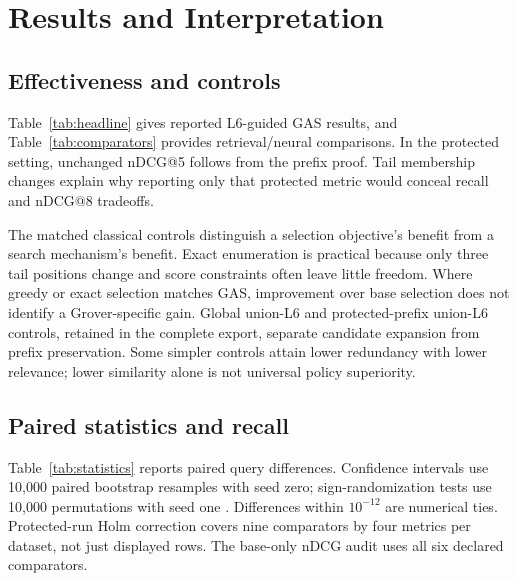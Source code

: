 \documentclass[conference]{IEEEtran}
\newcommand{\resultinput}[1]{}
\begin{document}
\section{Results and Interpretation}\label{sec:results}
\subsection{Effectiveness and controls}
Table~\ref{tab:headline} gives reported L6-guided GAS results, and Table~\ref{tab:comparators} provides retrieval/neural comparisons. \resultinput{findings.tex}
In the protected setting, unchanged nDCG@5 follows from the prefix proof. Tail membership changes explain why reporting only that protected metric would conceal recall and nDCG@8 tradeoffs.
\resultinput{fiqa_followup.tex}

\begin{table}[t]
\centering\small\setlength{\tabcolsep}{3pt}
\caption{Reported L6-guided GAS full-test means. Red. is lower-is-better. \protect\resultinput{configuration_note.tex}}
\label{tab:headline}
\resultinput{headline.tex}
\end{table}

\begin{table}[t]
\centering\small\setlength{\tabcolsep}{4pt}
\caption{Full-test comparisons. n@5: nDCG@5; R@8: Recall@8; Red.: clipped-positive cosine redundancy. GAS/matched optimizers follow Table~\ref{tab:headline}. Base/L6-only use hybrid fifteen; dense-fifteen controls use a different shortlist.}
\label{tab:comparators}
\resultinput{comparators.tex}
\end{table}

The matched classical controls distinguish a selection objective's benefit from a search mechanism's benefit. Exact enumeration is practical because only three tail positions change and score constraints often leave little freedom. Where greedy or exact selection matches GAS, improvement over base selection does not identify a Grover-specific gain. Global union-L6 and protected-prefix union-L6 controls, retained in the complete export, separate candidate expansion from prefix preservation. Some simpler controls attain lower redundancy with lower relevance; lower similarity alone is not universal policy superiority.

\subsection{Paired statistics and recall}
Table~\ref{tab:statistics} reports paired query differences. Confidence intervals use 10,000 paired bootstrap resamples with seed zero; sign-randomization tests use 10,000 permutations with seed one \cite{smucker2007tests}. Differences within \(10^{-12}\) are numerical ties. Protected-run Holm correction \cite{holm1979multiple} covers nine comparators by four metrics per dataset, not just displayed rows. The base-only nDCG audit uses all six declared comparators.
\end{document}
